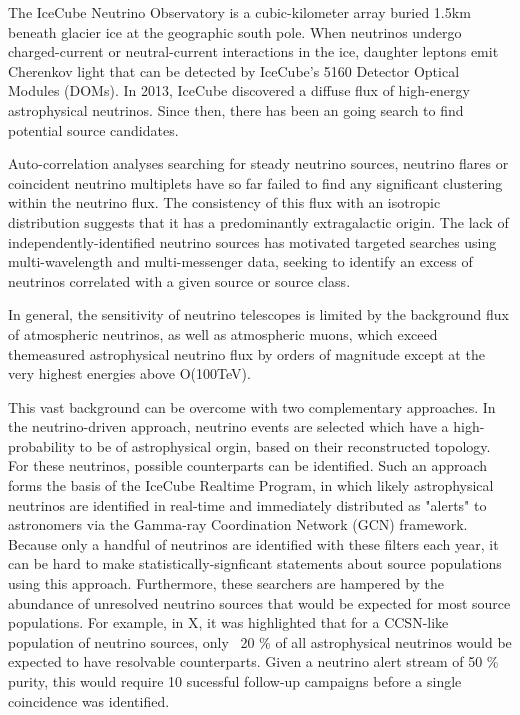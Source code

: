 \documentclass[]{article}
\begin{document}
	The IceCube Neutrino Observatory is a cubic-kilometer array buried 1.5km beneath glacier ice at the geographic south pole. When neutrinos undergo charged-current  or neutral-current interactions in the ice, daughter leptons emit Cherenkov light that can be detected by IceCube's 5160 Detector Optical Modules (DOMs). 
	In 2013, IceCube discovered a diffuse flux of high-energy astrophysical neutrinos. Since then, there has been an going search to find potential source candidates. 
	
	Auto-correlation analyses searching for steady neutrino sources, neutrino flares or coincident neutrino multiplets have so far failed to find any significant clustering within the neutrino flux. The consistency of this flux with an isotropic distribution suggests that it has a predominantly extragalactic origin. The lack of independently-identified neutrino sources has motivated targeted searches using multi-wavelength and multi-messenger data, seeking to identify an excess of neutrinos correlated with a given source or source class.
	
	In general, the sensitivity of neutrino telescopes is limited by the background flux of atmospheric neutrinos, as well as atmospheric muons, which exceed themeasured astrophysical neutrino flux by orders of magnitude except at the very highest energies above O(100TeV). 
	
	This vast background can be overcome with two complementary approaches. In the neutrino-driven approach, neutrino events are selected which have a high-probability to be of astrophysical orgin, based on their reconstructed topology. For these neutrinos, possible counterparts can be identified. Such an approach forms the basis of the IceCube Realtime Program, in which likely astrophysical neutrinos are identified in real-time and immediately distributed as "alerts" to astronomers via the Gamma-ray Coordination Network (GCN) framework. Because only a handful of neutrinos are identified with these filters each year, it can be hard to make statistically-signficant statements about source populations using this approach. Furthermore, these searchers are hampered by the abundance of unresolved neutrino sources that would be expected for most source populations. For example, in X, it was highlighted that for a CCSN-like population of neutrino sources, only ~20 \% of all astrophysical neutrinos would be expected to have resolvable counterparts. Given a neutrino alert stream of 50 \% purity, this would require 10 sucessful follow-up campaigns before a single coincidence was identified.
	
\end{document}
